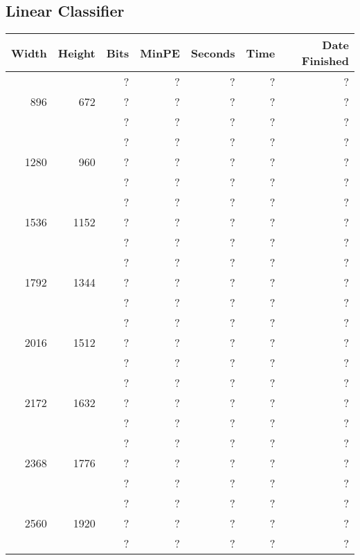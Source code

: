 \newpage
\subsection{Linear Classifier}
  \begin{center}
  \begin{tabular}{ r r r | r | r r r }
  Width & Height & Bits & MinPE & Seconds & Time & Date Finished \\ \hline
  \multirow{3}{*}{896} & \multirow{3}{*}{672} & ? & ? & ? & ? & ? \\
  & & ? & ? & ? & ? & ? \\
  & & ? & ? & ? & ? & ? \\
  \hline
  \multirow{3}{*}{1280} & \multirow{3}{*}{960} & ? & ? & ? & ? & ? \\
  & & ? & ? & ? & ? & ? \\
  & & ? & ? & ? & ? & ? \\
  \hline
  \multirow{3}{*}{1536} & \multirow{3}{*}{1152} & ? & ? & ? & ? & ? \\
  & & ? & ? & ? & ? & ? \\
  & & ? & ? & ? & ? & ? \\
  \hline
  \multirow{3}{*}{1792} & \multirow{3}{*}{1344} & ? & ? & ? & ? & ? \\
  & & ? & ? & ? & ? & ? \\
  & & ? & ? & ? & ? & ? \\
  \hline
  \multirow{3}{*}{2016} & \multirow{3}{*}{1512} & ? & ? & ? & ? & ? \\
  & & ? & ? & ? & ? & ? \\
  & & ? & ? & ? & ? & ? \\
  \hline
  \multirow{3}{*}{2172} & \multirow{3}{*}{1632} & ? & ? & ? & ? & ? \\
  & & ? & ? & ? & ? & ? \\
  & & ? & ? & ? & ? & ? \\
  \hline
  \multirow{3}{*}{2368} & \multirow{3}{*}{1776} & ? & ? & ? & ? & ? \\
  & & ? & ? & ? & ? & ? \\
  & & ? & ? & ? & ? & ? \\
  \hline
  \multirow{3}{*}{2560} & \multirow{3}{*}{1920} & ? & ? & ? & ? & ? \\
  & & ? & ? & ? & ? & ? \\
  & & ? & ? & ? & ? & ? \\
  \end{tabular}
  \end{center}